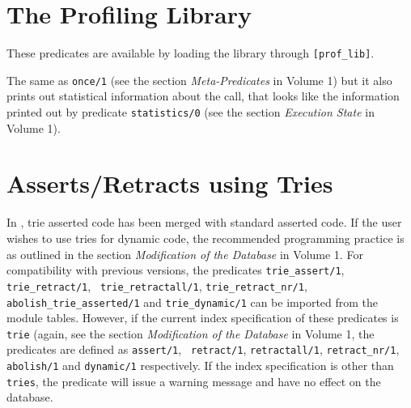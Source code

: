 \section{The Profiling Library}

These predicates are available by loading the library through
{\tt [prof\_lib]}.

\begin{description}
     The same as {\tt once/1} (see the section {\it Meta-Predicates}
in Volume 1)
     but it also prints out statistical information about the call,
     that looks like the information printed out by predicate
     {\tt statistics/0} (see the section {\it Execution State} in Volume 1).
\end{description}

%
\section{Asserts/Retracts using Tries }


In \version, trie asserted code has been merged with standard asserted
code.  If the user wishes to use tries for dynamic code, the
recommended programming practice is as outlined in the section {\it
Modification of the Database} in Volume 1.
For compatibility with previous versions, the
predicates {\tt trie\_assert/1}, {\tt trie\_retract/1}, {\tt
trie\_retractall/1}, {\tt trie\_retract\_nr/1}, {\tt
abolish\_trie\_asserted/1} and {\tt trie\_dynamic/1} can be imported
from the module {\sf tables}.  However, if the current index
specification of these predicates is {\tt trie} (again, see the
section {\it Modification of the Database} in Volume 1, the predicates
are defined as {\tt assert/1}, {\tt 
retract/1}, {\tt retractall/1}, {\tt retract\_nr/1}, {\tt abolish/1}
and {\tt dynamic/1} respectively.  If the index specification is other
than {\tt tries}, the predicate will issue a warning message and have
no effect on the database.

